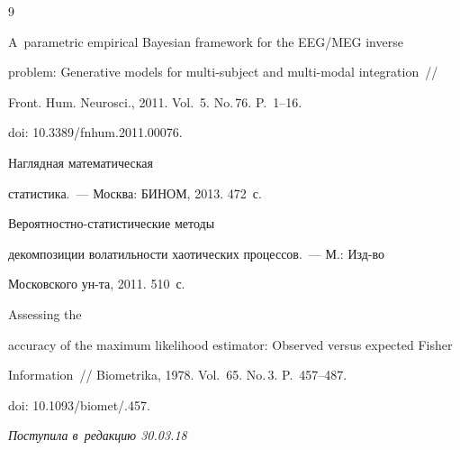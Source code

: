 {{\begin{thebibliography}{9}




    A~parametric empirical Bayesian framework for the EEG\!/\!MEG inverse 


problem: Generative models for multi-subject and multi-modal integration~/\!\!/ 


Front. Hum. Neurosci., 2011. Vol.~5. No.\,76. P.~1--16.


doi: 10.3389\!/\!fnhum.2011.00076.




     Наглядная математическая 


статистика.~--- Москва: БИНОМ, 2013. 472~с.




     Вероятностно-статистические методы 


декомпозиции волатильности хаотических процессов.~--- М.: Изд-во 


Московского ун-та, 2011. 510~с.




     Assessing the 


accuracy of the maximum likelihood estimator: Observed versus expected Fisher 


Information~/\!\!/ Biometrika, 1978. Vol.~65. No.\,3. P.~457--487.


doi: 10.1093\!/\!biomet\!/.457.


        \end{thebibliography}


} }








\vspace*{-3pt}





\hfill{\small\textit{Поступила в~редакцию 30.03.18}}














\vspace*{8pt}





